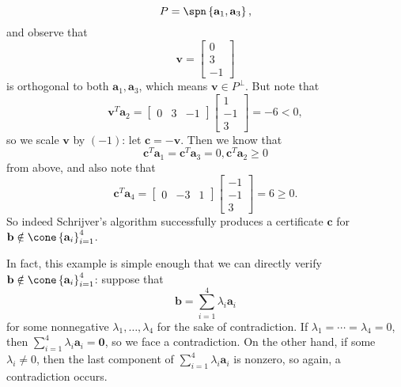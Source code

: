 \documentclass{article}
\renewcommand{\vec}{\mathbf}
\begin{document}
\begin{equation*}
    P = \spn\left\lbrace \vec{a}_1, \vec{a}_3 \right\rbrace,
\end{equation*}
and observe that
\begin{equation*}
    \vec{v} = \begin{bmatrix} 0\\3\\-1 \end{bmatrix} 
\end{equation*}
is orthogonal to both $\vec{a}_1,\vec{a}_3$, which means $\vec{v}\in P^{\perp}$. But note that
\begin{equation*}
    \vec{v}^{T} \vec{a}_2 = \begin{bmatrix} 0&3&-1 \end{bmatrix} \begin{bmatrix} 1\\-1\\3 \end{bmatrix} = -6 < 0,
\end{equation*}
so we scale $\vec{v}$ by $\left( -1 \right)$: let $\vec{c}=-\vec{v}$. Then we know that
\begin{equation*}
    \vec{c}^{T} \vec{a}_1 = \vec{c}^{T} \vec{a}_3 = 0, \vec{c}^{T} \vec{a}_2\geq 0
\end{equation*}
from above, and also note that
\begin{equation*}
    \vec{c}^{T} \vec{a}_4 = \begin{bmatrix} 0&-3&1 \end{bmatrix} \begin{bmatrix} -1\\-1\\3 \end{bmatrix} = 6 \geq 0.
\end{equation*}
So indeed Schrijver's algorithm successfully produces a certificate $\vec{c}$ for $\vec{b}\notin\cone\left\lbrace \vec{a}_{i} \right\rbrace^{4}_{i=1} $.

In fact, this example is simple enough that we can directly verify $\vec{b}\notin\cone\left\lbrace \vec{a}_{i} \right\rbrace^{4}_{i=1} $: suppose that
\begin{equation*}
    \vec{b} = \sum^{4}_{i=1} \lambda_i\vec{a}_i
\end{equation*}
for some nonnegative $\lambda_1,\ldots,\lambda_4$ for the sake of contradiction. If $\lambda_1=\cdots=\lambda_4=0$, then $\sum^{4}_{i=1} \lambda_i\vec{a}_i =\vec{0}$, so we face a contradiction. On the other hand, if some $\lambda_i\neq 0$, then the last component of $\sum^{4}_{i=1} \lambda_i\vec{a}_i$ is nonzero, so again, a contradiction occurs.
\end{document}
